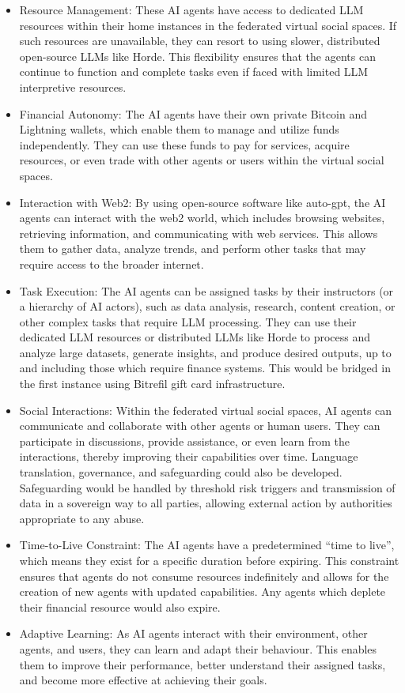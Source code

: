 \begin{itemize}
\item Resource Management: These AI agents have access to dedicated LLM resources within their home instances in the federated virtual social spaces. If such resources are unavailable, they can resort to using slower, distributed open-source LLMs like Horde. This flexibility ensures that the agents can continue to function and complete tasks even if faced with limited LLM interpretive resources.
\item Financial Autonomy: The AI agents have their own private Bitcoin and Lightning wallets, which enable them to manage and utilize funds independently. They can use these funds to pay for services, acquire resources, or even trade with other agents or users within the virtual social spaces.
\item Interaction with Web2: By using open-source software like auto-gpt, the AI agents can interact with the web2 world, which includes browsing websites, retrieving information, and communicating with web services. This allows them to gather data, analyze trends, and perform other tasks that may require access to the broader internet.
\item Task Execution: The AI agents can be assigned tasks by their instructors (or a hierarchy of AI actors), such as data analysis, research, content creation, or other complex tasks that require LLM processing. They can use their dedicated LLM resources or distributed LLMs like Horde to process and analyze large datasets, generate insights, and produce desired outputs, up to and including those which require finance systems. This would be bridged in the first instance using Bitrefil gift card infrastructure.
\item Social Interactions: Within the federated virtual social spaces, AI agents can communicate and collaborate with other agents or human users. They can participate in discussions, provide assistance, or even learn from the interactions, thereby improving their capabilities over time. Language translation, governance, and safeguarding could also be developed. Safeguarding would be handled by threshold risk triggers and transmission of data in a sovereign way to all parties, allowing external action by authorities appropriate to any abuse.
\item Time-to-Live Constraint: The AI agents have a predetermined ``time to live'', which means they exist for a specific duration before expiring. This constraint ensures that agents do not consume resources indefinitely and allows for the creation of new agents with updated capabilities. Any agents which deplete their financial resource would also expire.
\item Adaptive Learning: As AI agents interact with their environment, other agents, and users, they can learn and adapt their behaviour. This enables them to improve their performance, better understand their assigned tasks, and become more effective at achieving their goals.
\end{itemize}

